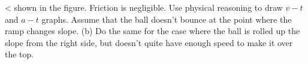  <%
shown in the figure. Friction is negligible. Use physical
reasoning to draw $v-t$ and $a-t$ graphs. Assume that the
ball doesn't bounce at the point where the ramp changes
slope. (b) Do the same for the case where the ball is rolled
up the slope from the right side, but doesn't quite have
enough speed to make it over the top.
